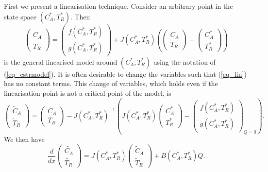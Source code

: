 First we present a linearisation technique. Consider an arbitrary point in the state space $(C_A^*, T_R^*)$. Then
\begin{equation}
\begin{pmatrix}
\dot{C_A} \\ \dot{T_R}
\end{pmatrix} = \begin{pmatrix}
f(C_A^*, T_R^*) \\ g(C_A^*, T_R^*)
\end{pmatrix} + J(C_A^*, T_R^*) \left( \begin{pmatrix}
C_A \\ T_R
\end{pmatrix} - \begin{pmatrix}
C_A^* \\ T_R^* 
\end{pmatrix}\right)
\label{eq_lin}
\end{equation}
is the general linearised model around $(C_A^*, T_R^*)$ using the notation of (\ref{eq_cstrmodel}). It is often desirable to change the variables such that (\ref{eq_lin}) has no constant terms. This change of variables, which holds even if the linearisation point is not a critical point of the model, is 
\begin{equation}
\begin{pmatrix}
\tilde{C}_A \\ \tilde{T}_R
\end{pmatrix} = \begin{pmatrix}
C_A \\ T_R
\end{pmatrix} - J(C_A^*, T_R^*)^{-1}\left(J(C_A^*, T_R^*)\begin{pmatrix}
C_A^* \\ T_R^* 
\end{pmatrix} - \begin{pmatrix}
f(C_A^*, T_R^*) \\ g(C_A^*, T_R^*)
\end{pmatrix}_{Q=0} \right).
\label{eq_change_vars}
\end{equation}
We then have
\begin{equation}
\frac{d}{dx}\begin{pmatrix}
\tilde{C_A} \\ \tilde{T_R}
\end{pmatrix} =  J(C_A^*, T_R^*)\begin{pmatrix}
\tilde{C}_A \\ \tilde{T}_R
\end{pmatrix} + B(C_A^*, T_R^*)Q.
\label{eq_lin2}
\end{equation}
